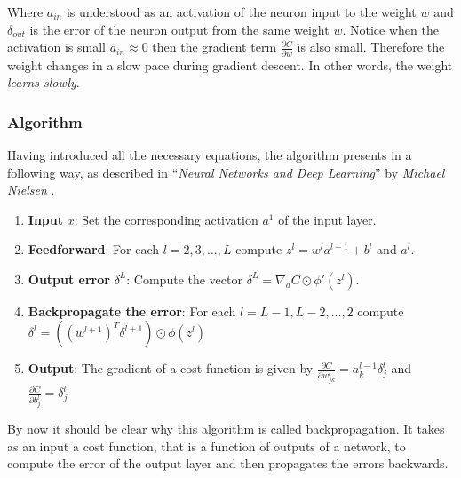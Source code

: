 Where $a_{in}$ is understood as an activation of the neuron input to the weight $w$ and $\delta_{out}$ is the error of the neuron output from the same weight $w$. Notice when the activation is small $a_{in} \approx 0$ then the gradient term $\frac{\partial C}{\partial w}$ is also small. Therefore the weight changes in a slow pace during gradient descent. In other words, the weight \emph{learns slowly}.


\subsubsection*{Algorithm}
\label{sub2:bp-algorithm}

Having introduced all the necessary equations, the algorithm presents in a following way, as described in ``\emph{Neural Networks and Deep Learning}'' by \emph{Michael Nielsen} \cite{NNandDL}.

\begin{enumerate}
    \item \textbf{Input} $x$: Set the corresponding activation $a^1$ of the input layer.
    \item \textbf{Feedforward}: For each $l = 2, 3, ..., L$ compute $z^l = w^la^{l-1}+b^l$ and $a^l$.
    \item \textbf{Output error} $\delta^L$: Compute the vector $\delta^L = \nabla_a C \odot \phi'(z^l)$.
    \item \textbf{Backpropagate the error}: For each $l = L-1, L-2, ..., 2$ compute 
        $\delta^l = \left((w^{l+1})^T \delta^{l+1}\right) \odot \phi(z^l)$
    \item \textbf{Output}: The gradient of a cost function is given by 
        $\frac{\partial C}{\partial w^l_{jk}} = a^{l-1}_k \delta^l_j$ 
        and 
        $\frac{\partial C}{\partial b^l_j} = \delta^l_j$
\end{enumerate}

By now it should be clear why this algorithm is called backpropagation. It takes as an input a cost function, that is a function of outputs of a network, to compute the error of the output layer and then propagates the errors backwards.